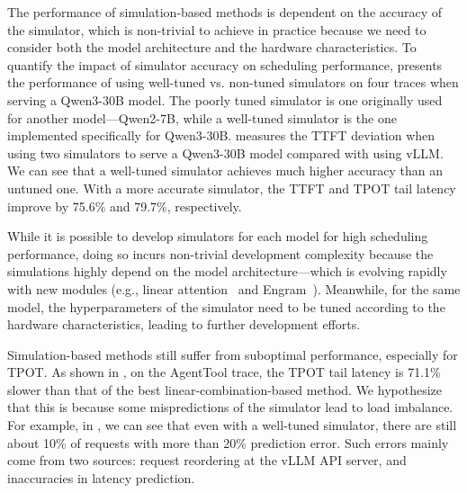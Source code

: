 The performance of simulation-based methods is dependent on the accuracy of the simulator,
which is non-trivial to achieve in practice because
we need to consider both the model architecture and the hardware characteristics.
To quantify the impact of simulator accuracy on scheduling performance,
{} presents the performance of
using well-tuned vs. non-tuned simulators on four traces when serving a Qwen3-30B model.
The poorly tuned simulator is one originally used for another model---Qwen2-7B,
while a well-tuned simulator is the one implemented specifically for Qwen3-30B.
{} measures the TTFT deviation when using
two simulators to serve a Qwen3-30B model compared with using vLLM.
We can see that a well-tuned simulator achieves much higher accuracy than an untuned one.
With a more accurate simulator, the TTFT and TPOT tail latency improve
by 75.6\% and 79.7\%, respectively.

While it is possible to develop simulators for each model for high scheduling performance, 
doing so incurs non-trivial development complexity
because the simulations 
highly depend on the model architecture---which is evolving rapidly
with new modules (e.g., linear attention~\cite{qwen3-next} and Engram~\cite{cheng2026conditionalmemoryscalablelookup}).
Meanwhile, for the same model, the hyperparameters of the simulator need to be tuned according to the hardware characteristics,
leading to further development efforts. 

Simulation-based methods still suffer from suboptimal performance,
especially for TPOT.
As shown in {},
on the AgentTool trace, the TPOT tail latency is 71.1\% slower than that of the best linear-combination-based method.
We hypothesize that this is because some mispredictions of the simulator lead to load imbalance.
For example, in {}, we can see
that even with a well-tuned simulator, there are still about 10\% of requests with more than 20\% prediction error.
Such errors mainly come from two sources: request reordering at the vLLM API server,
and inaccuracies in latency prediction.

